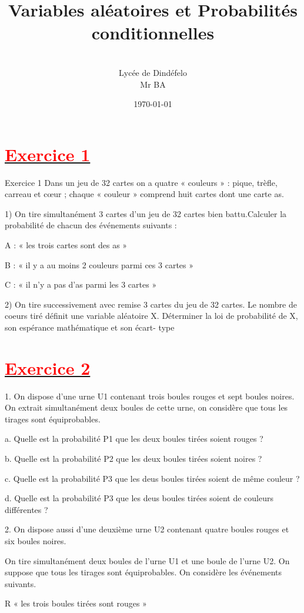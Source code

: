 \documentclass[12pt]{article}
\author{\\Lycée de Dindéfelo\\Mr BA}
\title{\textbf{Variables aléatoires et Probabilités conditionnelles}}
\date{\today}
\begin{document}
\maketitle
\newpage
\section*{\underline{\textbf{\textcolor{red}{Exercice 1}}}}
Exercice 1
Dans un jeu de 32 cartes on a quatre « couleurs » : pique, trèfle, carreau et cœur ; chaque « couleur » comprend huit cartes dont une carte as.

1) On tire simultanément 3 cartes d’un jeu de 32 cartes bien battu.Calculer la probabilité de chacun des événements suivants :

  A : « les trois cartes sont des as »
  
  B : « il y a au moins 2 couleurs parmi ces 3 cartes »
  
  C : « il n’y a pas d’as parmi les 3 cartes »
  
2) On tire successivement avec remise 3 cartes du jeu de 32 cartes. Le nombre de coeurs tiré définit une variable aléatoire X. Déterminer la loi de probabilité de  X, son espérance mathématique et son écart- type
\section*{\underline{\textbf{\textcolor{red}{Exercice 2}}}}
1. On dispose d’une urne U1 contenant trois boules rouges et sept boules noires.
On extrait simultanément deux boules de cette urne, on considère que tous les tirages sont équiprobables.

a. Quelle est la probabilité P1 que les deux boules tirées soient rouges ?

    b. Quelle est la probabilité P2 que les deux boules tirées soient noires ?
    
    c. Quelle est la probabilité P3 que les deus boules tirées soient de même couleur ?
    
    d. Quelle est la probabilité P3 que les deus boules tirées soient de couleurs différentes ?
    
2. On dispose aussi d’une deuxième urne U2 contenant quatre boules rouges et six boules noires.

On tire simultanément deux boules de l’urne U1 et une boule de l’urne U2. On suppose que tous les tirages sont équiprobables. On considère les événements suivants.

R « les trois boules tirées sont rouges »   
\end{document}
